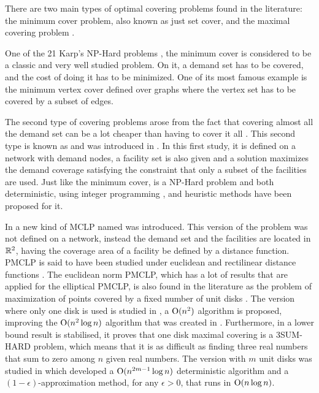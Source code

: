 There are two main types of optimal covering problems found in the literature: the minimum cover problem, also known as just set cover, and the maximal covering problem \cite{karatas}. 

One of the 21 Karp's NP-Hard problems \cite{karp}, the minimum cover is considered to be a classic and very well studied problem. On it, a demand set has to be covered, and the cost of doing it has to be minimized. One of its most famous example is the minimum vertex cover defined over graphs where the vertex set has to be covered by a subset of edges.

The second type of covering problems arose from the fact that covering almost all the demand set can be a lot cheaper than having to cover it all \cite{garcia}. This second type is known as  and was introduced in \cite{church:1974}. In this first study, it is defined on a network with demand nodes, a facility set is also given and a solution maximizes the demand coverage satisfying the constraint that only a subset of the facilities are used. Just like the minimum cover, \MCLP is a NP-Hard problem \cite{hatta:2013} and both deterministic, using integer programming \cite{church:1974}, and heuristic methods \cite{revelle:2008} have been proposed for it. 

In \cite{church:1984} a new kind of MCLP named  was introduced. This version of the problem was not defined on a network, instead the demand set and the facilities are located in $\mathbb{R}^2$, having the coverage area of a facility be defined by a distance function. PMCLP is said to have been studied under euclidean and rectilinear distance functions \cite{younies}. The euclidean norm PMCLP, which has a lot of results that are applied for the elliptical PMCLP, is also found in the literature as the problem of maximization of points covered by a fixed number of unit disks \cite{cabello:2006}. The version where only one disk is used is studied in \cite{chazelle:1986}, a $\mathrm{O}(n^2)$ algorithm is proposed, improving the $\mathrm{O}(n^2\log{n})$ algorithm that was created in \cite{drezner}. Furthermore, in \cite{aronov:2008} a lower bound result is stabilised, it proves that one disk maximal covering is a 3SUM-HARD problem, which means that it is as difficult as finding three real numbers that sum to zero among $n$ given real numbers. 
The version with $m$ unit disks was studied in \cite{cabello:2006} which developed a $\mathrm{O}(n^{2m-1}\log{n})$ deterministic algorithm and a $(1-\epsilon)$-approximation method, for any $\epsilon > 0$, that runs in $\mathrm{O}(n\log{n})$.


